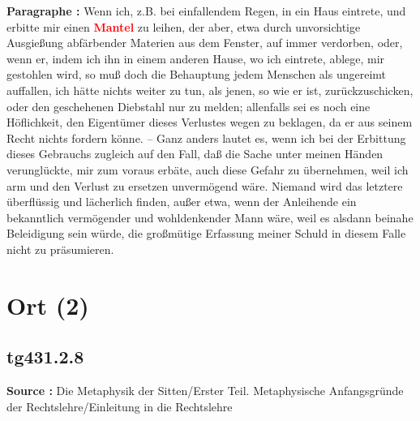 \documentclass[a4paper,12pt,twoside]{book}
\newcommand{\match}[1]{\textcolor{red}{\textbf{#1}}}
\newcommand{\unnumberedsection}[1]{
	\section*{#1}
	\addcontentsline{toc}{section}{#1}
	\markright{#1}
}
\begin{document}
	\textbf{Paragraphe : }Wenn ich, z.B. bei einfallendem Regen, in ein Haus eintrete, und erbitte mir einen \match{Mantel} zu leihen, der aber, etwa durch unvorsichtige Ausgießung abfärbender Materien aus dem Fenster, auf immer verdorben, oder, wenn er, indem ich ihn in einem anderen Hause, wo ich eintrete, ablege, mir gestohlen wird, so muß doch die Behauptung jedem Menschen als ungereimt auffallen, ich hätte nichts weiter zu tun, als jenen, so wie er ist, zurückzuschicken, oder den geschehenen Diebstahl nur zu melden; allenfalls sei es noch eine Höflichkeit, den Eigentümer dieses Verlustes wegen zu beklagen, da er aus seinem Recht nichts fordern könne. – Ganz anders lautet es, wenn ich bei der Erbittung dieses Gebrauchs zugleich auf den Fall, daß die Sache unter meinen Händen verunglückte, mir zum voraus erbäte, auch diese Gefahr zu übernehmen, weil ich arm und den Verlust zu ersetzen unvermögend wäre. Niemand wird das letztere überflüssig und lächerlich finden, außer etwa, wenn der Anleihende ein bekanntlich vermögender und wohldenkender Mann wäre, weil es alsdann beinahe Beleidigung sein würde, die großmütige Erfassung meiner Schuld in diesem Falle nicht zu präsumieren. 
	
	\unnumberedsection{Ort (2)} 
	\subsection*{tg431.2.8} 
	\textbf{Source : }Die Metaphysik der Sitten/Erster Teil. Metaphysische Anfangsgründe der Rechtslehre/Einleitung in die Rechtslehre\\  
	
\end{document}
